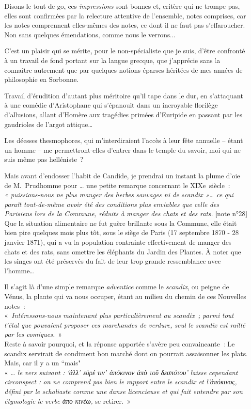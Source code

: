 \documentclass{book}%
\newcommand{\italique}[1]{\textit{#1}}%
\begin{document}
Disons-le tout de go, ces \italique{impressions} sont bonnes et, critère qui ne trompe pas, elles sont confirmées par la relecture attentive de l’ensemble, notes comprises, car les notes comprennent elles-mêmes des notes, ce dont il ne faut pas s’effaroucher. Non sans quelques émendations, comme nous le verrons... 

C’est un plaisir qui se mérite, pour le non-spécialiste que je suis, d’être confronté à un travail de fond portant sur la langue grecque, que j’apprécie sans la connaître autrement que par quelques notions éparses héritées de mes années de philosophie en Sorbonne. 

Travail d’érudition d’autant plus méritoire qu’il tape dans le dur, en s’attaquant à une comédie d’Aristophane qui s’épanouit dans un incroyable florilège d’allusions, allant d’Homère aux tragédies primées d’Euripide en passant par les gaudrioles de l’argot attique… 

Les déesses thesmophores, qui m’interdiraient l’accès à leur fête annuelle -- étant un homme -- me permettront-elles d’entrer dans le temple du savoir, moi qui ne suis même pas helléniste ? 

Mais avant d’endosser l’habit de Candide, je prendrai un instant la plume d’oie de M. Prudhomme pour … une petite remarque concernant le XIXe siècle : \\
\italique{« puissions-nous ne plus manger des herbes sauvages ni de scandix »… ce qui paraît tout-de-même avoir été des conditions plus enviables que celle des Parisiens lors de la Commune, réduits à manger des chats et des rats.} [note n°28] \\
Que la situation alimentaire ne fut guère brillante sous la Commune, elle était bien pire quelques mois plus tôt, sous le siège de Paris (17 septembre 1870 - 28 janvier 1871), qui a vu la population contrainte effectivement de manger des chats et des rats, sans omettre les éléphants du Jardin des Plantes. 
À noter que les singes ont été préservés du fait de leur trop grande ressemblance avec l’homme… 

Il s’agit là d’une simple remarque \italique{adventice} comme le \italique{scandix}, ou peigne de Vénus, la plante qui va nous occuper, étant au milieu du chemin de ces Nouvelles notes :\\
« \italique{Intéressons-nous maintenant plus particulièrement au scandix ; parmi tout l’étal que pouvaient proposer ces marchandes de verdure, seul le scandix est raillé par les comiques.} » \\
Reste à savoir pourquoi, et la réponse apportée s’avère peu convaincante : Le scandix servirait de condiment bon marché dont on pourrait assaisonner les plats. Mais, car il y a un ``mais"\\
« \italique{… le vers suivant : `ἀλλ᾽ εὑρέ τιν᾽ ἀπόκινον ἀπὸ τοῦ δεσπότου' laisse cependant circonspect : on ne comprend pas bien le rapport entre le scandix et l’ἀπόκινος, défini par le scholiaste comme une danse licencieuse et qui fait entendre par son étymologie le verbe ἀπο-κινέω,} se retirer. »\\
\end{document}
